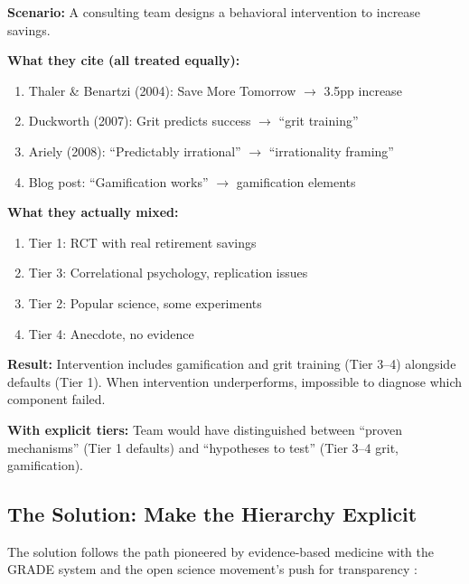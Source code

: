 \documentclass[11pt, a4paper]{article}
\begin{document}
\begin{tcolorbox}[colback=yellow!5!white, colframe=yellow!75!black,
    title=Case Study: A Consulting Project Without Explicit Tiers]

\textbf{Scenario:} A consulting team designs a behavioral intervention to increase savings.

\textbf{What they cite (all treated equally):}
\begin{enumerate}[nosep]
    \item Thaler \& Benartzi (2004): Save More Tomorrow $\to$ 3.5pp increase
    \item Duckworth (2007): Grit predicts success $\to$ ``grit training''
    \item Ariely (2008): ``Predictably irrational'' $\to$ ``irrationality framing''
    \item Blog post: ``Gamification works'' $\to$ gamification elements
\end{enumerate}

\textbf{What they actually mixed:}
\begin{enumerate}[nosep]
    \item Tier 1: RCT with real retirement savings
    \item Tier 3: Correlational psychology, replication issues
    \item Tier 2: Popular science, some experiments
    \item Tier 4: Anecdote, no evidence
\end{enumerate}

\textbf{Result:} Intervention includes gamification and grit training (Tier 3--4) alongside defaults (Tier 1). When intervention underperforms, impossible to diagnose which component failed.

\textbf{With explicit tiers:} Team would have distinguished between ``proven mechanisms'' (Tier 1 defaults) and ``hypotheses to test'' (Tier 3--4 grit, gamification).

\end{tcolorbox}

\subsection{The Solution: Make the Hierarchy Explicit}

The solution follows the path pioneered by evidence-based medicine with the GRADE system \citep{PAP-guyatt2008grade} and the open science movement's push for transparency \citep{nosek2015, munafò2017}:
\end{document}
